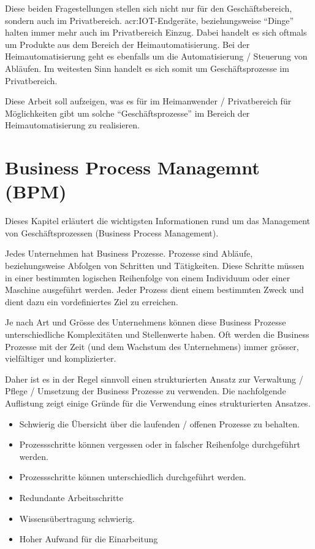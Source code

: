 Diese beiden Fragestellungen stellen sich nicht nur für den Geschäftsbereich, sondern auch im Privatbereich. \gls{acr:IOT}-Endgeräte, beziehungsweise "`Dinge"' halten immer mehr auch im Privatbereich Einzug. Dabei handelt es sich oftmals um Produkte aus dem Bereich der Heimautomatisierung. Bei der Heimautomatisierung geht es ebenfalls um die Automatisierung / Steuerung von Abläufen. Im weitesten Sinn handelt es sich somit um Geschäftsprozesse im Privatbereich.

Diese Arbeit soll aufzeigen, was es für im Heimanwender / Privatbereich für Möglichkeiten gibt um solche "`Geschäftsprozesse"' im Bereich der Heimautomatisierung zu realisieren.







\section{Business Process Managemnt (BPM)} \label{sec:Ausg:BPM}
Dieses Kapitel erläutert die wichtigsten Informationen rund um das Management von Geschäftsprozessen (Business Process Management).

Jedes Unternehmen hat Business Prozesse. Prozesse sind Abläufe, beziehungsweise Abfolgen von Schritten und Tätigkeiten. Diese Schritte müssen in einer bestimmten logischen Reihenfolge von einem Individuum oder einer Maschine ausgeführt werden. Jeder Prozess dient einem bestimmten Zweck und dient dazu ein vordefiniertes Ziel zu erreichen.

Je nach Art und Grösse des Unternehmens können diese Business Prozesse unterschiedliche Komplexitäten und Stellenwerte haben. Oft werden die Business Prozesse mit der Zeit (und dem Wachstum des Unternehmens) immer grösser, vielfältiger und komplizierter.

Daher ist es in der Regel sinnvoll einen strukturierten Ansatz zur Verwaltung / Pflege / Umsetzung der Business Prozesse zu verwenden. Die nachfolgende Auflistung zeigt einige Gründe für die Verwendung eines strukturierten Ansatzes.

\begin{itemize}
\item Schwierig die Übersicht über die laufenden / offenen Prozesse zu behalten.
\item Prozessschritte können vergessen oder in falscher Reihenfolge durchgeführt werden.
\item Prozessschritte können unterschiedlich durchgeführt werden.
\item Redundante Arbeitsschritte
\item Wissensübertragung schwierig.
\item Hoher Aufwand für die Einarbeitung
\end{itemize}

